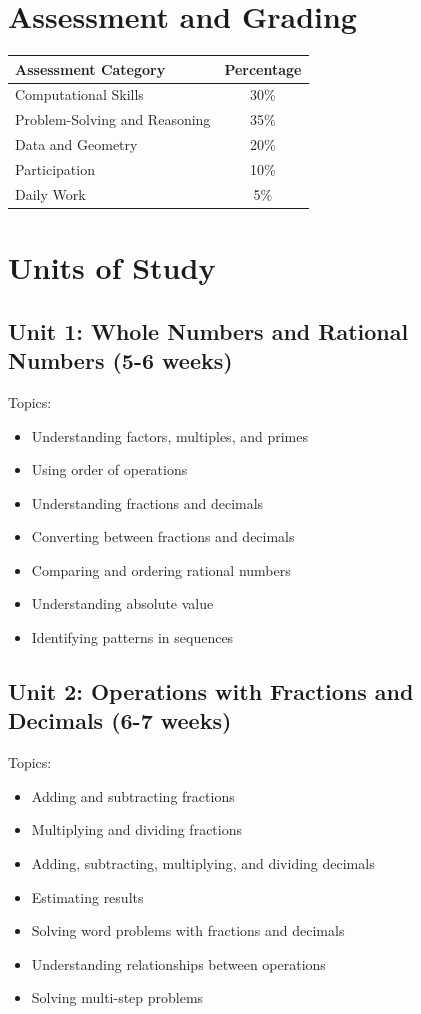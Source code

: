 \documentclass[11pt,letterpaper]{report}
\begin{document}
\section{Assessment and Grading}

\begin{center}
\begin{tabular}{|l|c|}
\hline
\textbf{Assessment Category} & \textbf{Percentage} \\
\hline
Computational Skills & 30\% \\
\hline
Problem-Solving and Reasoning & 35\% \\
\hline
Data and Geometry & 20\% \\
\hline
Participation & 10\% \\
\hline
Daily Work & 5\% \\
\hline
\end{tabular}
\end{center}

\section{Units of Study}

\subsection{Unit 1: Whole Numbers and Rational Numbers (5-6 weeks)}

Topics:
\begin{itemize}
\item Understanding factors, multiples, and primes
\item Using order of operations
\item Understanding fractions and decimals
\item Converting between fractions and decimals
\item Comparing and ordering rational numbers
\item Understanding absolute value
\item Identifying patterns in sequences
\end{itemize}

\subsection{Unit 2: Operations with Fractions and Decimals (6-7 weeks)}

Topics:
\begin{itemize}
\item Adding and subtracting fractions
\item Multiplying and dividing fractions
\item Adding, subtracting, multiplying, and dividing decimals
\item Estimating results
\item Solving word problems with fractions and decimals
\item Understanding relationships between operations
\item Solving multi-step problems
\end{itemize}
\end{document}
